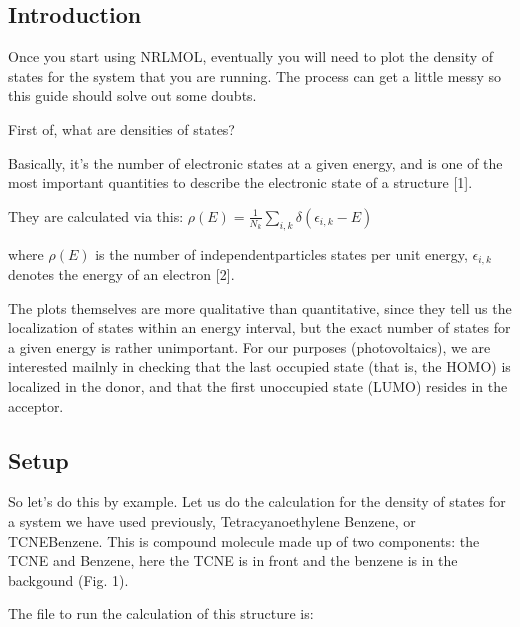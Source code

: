\documentclass[letterpaper,10pt,english,openany,oneside]{sphinxmanual}
\begin{document}
\subsection{Introduction}
\label{\detokenize{tutorials/ddos/density_of_states:introduction}}
\sphinxAtStartPar
Once you start using NRLMOL, eventually you will need to plot the density of states for the system that you are running. The process can get a little messy so this guide should solve out some doubts.

\sphinxAtStartPar
First of, what are densities of states?

\sphinxAtStartPar
Basically, it’s the number of electronic states at a given energy, and is one of the most important quantities to describe the electronic state of a structure {[}1{]}.

\sphinxAtStartPar
They are calculated via this:
\(\rho(E)=\frac{1}{N_k}\sum\limits_{i,k}\delta(\epsilon_{i,k}-E)\)

\sphinxAtStartPar
where \(\rho(E)\) is the number of independent\sphinxhyphen{}particles states per unit energy, \(\epsilon_{i,k}\) denotes the energy of an electron {[}2{]}.

\sphinxAtStartPar
The plots themselves are more qualitative than quantitative, since they tell us the localization of states within an energy interval, but the exact number of states for a given energy is rather unimportant. For our purposes (photovoltaics), we are interested mailnly in checking that the last occupied state (that is, the HOMO) is localized in the donor, and that the first unoccupied state (LUMO) resides in the acceptor.


\subsection{Setup}
\label{\detokenize{tutorials/ddos/density_of_states:setup}}
\sphinxAtStartPar
So let’s do this by example. Let us do the calculation for the density of states for a system we have used previously, Tetracyanoethylene Benzene, or TCNE\sphinxhyphen{}Benzene. This is compound molecule made up of two components: the TCNE and Benzene, here the TCNE is in front and the benzene is in the backgound (Fig. 1).

\begin{figure}[htbp]
\centering

\noindent{}
\end{figure}

\sphinxAtStartPar
The  file to run the calculation of this structure is:
\end{document}
